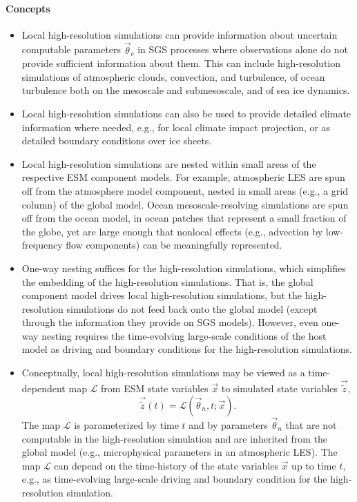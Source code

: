\documentclass{article}
\begin{document}
\paragraph{Concepts}
\begin{itemize}
    \item Local high-resolution simulations can provide information about uncertain computable parameters $\vec{\theta}_c$ in SGS processes where observations alone do not provide sufficient information about them. This can include high-resolution simulations of atmospheric clouds, convection, and turbulence, of ocean turbulence both on the mesoscale and submesoscale, and of sea ice dynamics. 
    \item Local high-resolution simulations can also be used to provide detailed climate information where needed, e.g., for local climate impact projection, or as detailed boundary conditions over ice sheets.
    \item Local high-resolution simulations are nested within small areas of the respective ESM component models. For example, atmospheric LES are spun off from the atmosphere model component, nested in small areas (e.g., a grid column) of the global model. Ocean mesoscale-resolving simulations are spun off from the ocean model, in ocean patches that represent a small fraction of the globe, yet are large enough that nonlocal effects (e.g., advection by low-frequency flow components) can be meaningfully represented.
    \item One-way nesting suffices for the high-resolution simulations, which simplifies the embedding of the high-resolution simulations. That is, the global component model drives local high-resolution simulations, but the high-resolution simulations do not feed back onto the global model (except through the information they provide on SGS models). However, even one-way nesting requires the time-evolving large-scale conditions of the host model as driving and boundary conditions for the high-resolution simulations. 
    \item Conceptually, local high-resolution simulations may be viewed as a time-depen\-dent map $\mathcal{L}$ from ESM state variables $\vec{x}$  to simulated state variables $\vec{\tilde z}$,
    \begin{equation}
    \vec{\tilde z}(t) = \mathcal{L}(\vec{\theta}_n,t; \vec{x}).
    \end{equation}
    The map $\mathcal{L}$ is parameterized by time $t$ and by parameters $\vec{\theta}_n$ that are not computable in the high-resolution simulation and are inherited from the global model (e.g., microphysical parameters in an atmospheric LES). The map $\mathcal{L}$ can depend on the time-history of the state variables $\vec{x}$ up to time $t$, e.g., as time-evolving large-scale driving and boundary condition for the high-resolution simulation. 

\end{itemize}
\end{document}
